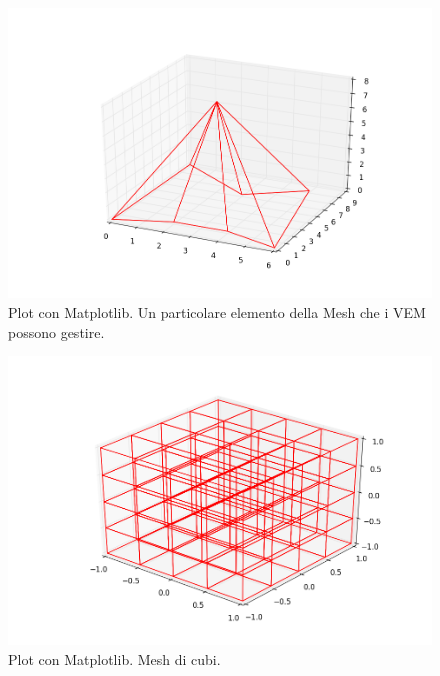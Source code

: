 \documentclass[oneside,12pt]{book}  %
\theoremstyle{plain}
\theoremstyle{definition}
\theoremstyle{remark}
\numberwithin{equation}{chapter} %
\begin{document}
\begin{figure}[h]
\label{img:matplotlibPolyhedron}
\centering
\includegraphics[scale=0.4]{Immagini/Project/matplotlibTest5.png}
\caption{Plot con Matplotlib. Un particolare elemento della Mesh che i
  VEM possono gestire.}
\end{figure}

\begin{figure}[h]
\label{img:matplotlibMesh}
\centering
\includegraphics[scale=0.4]{Immagini/Project/matplotlibPlotMesh.png}
\caption{Plot con Matplotlib. Mesh di cubi.}
\end{figure}

\end{document}
